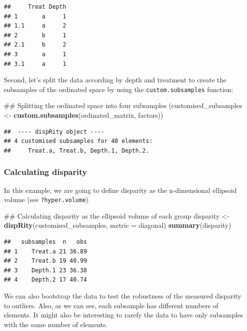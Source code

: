 \documentclass[]{book}
\newenvironment{Shaded}{\begin{snugshade}}{\end{snugshade}}
\newcommand{\KeywordTok}[1]{\textcolor[rgb]{0.13,0.29,0.53}{\textbf{#1}}}
\newcommand{\DataTypeTok}[1]{\textcolor[rgb]{0.13,0.29,0.53}{#1}}
\newcommand{\StringTok}[1]{\textcolor[rgb]{0.31,0.60,0.02}{#1}}
\newcommand{\NormalTok}[1]{#1}
\theoremstyle{definition}
\theoremstyle{definition}
\theoremstyle{remark}
\begin{document}
\begin{verbatim}
##     Treat Depth
## 1       a     1
## 1.1     a     2
## 2       b     1
## 2.1     b     2
## 3       a     1
## 3.1     a     1
\end{verbatim}

Second, let's split the data according by depth and treatment to create
the subsamples of the ordinated space by using the
\texttt{custom.subsamples} function:

\begin{Shaded}
\begin{Highlighting}[]
\NormalTok{## Splitting the ordinated space into four subsamples}
\NormalTok{(customised_subsamples <-}\StringTok{ }\KeywordTok{custom.subsamples}\NormalTok{(ordinated_matrix, factors))}
\end{Highlighting}
\end{Shaded}

\begin{verbatim}
##  ---- dispRity object ---- 
## 4 customised subsamples for 40 elements:
##     Treat.a, Treat.b, Depth.1, Depth.2.
\end{verbatim}

\subsubsection{Calculating disparity}\label{calculating-disparity}

In this example, we are going to define disparity as the n-dimensional
ellipsoid volume (see \texttt{?hyper.volume}).

\begin{Shaded}
\begin{Highlighting}[]
\NormalTok{## Calculating disparity as the ellipsoid volume of each group}
\NormalTok{disparity <-}\StringTok{ }\KeywordTok{dispRity}\NormalTok{(customised_subsamples, }\DataTypeTok{metric =}\NormalTok{ diagonal)}
\KeywordTok{summary}\NormalTok{(disparity)}
\end{Highlighting}
\end{Shaded}

\begin{verbatim}
##   subsamples  n   obs
## 1    Treat.a 21 36.89
## 2    Treat.b 19 40.99
## 3    Depth.1 23 36.38
## 4    Depth.2 17 40.74
\end{verbatim}

We can also bootstrap the data to test the robustness of the measured
disparity to outliers. Also, as we can see, each subsample has different
numbers of elements. It might also be interesting to rarefy the data to
have only subsamples with the same number of elements.
\end{document}
